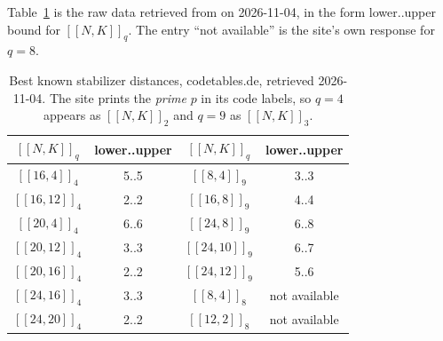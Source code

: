 Table~\ref{tab:grassl} is the raw data retrieved from
\cite{GrasslCodetables} on 2026-11-04, in the form lower..upper bound for
$[[N,K]]_q$. The entry ``not available'' is the site's own response for
$q=8$.

\begin{table}[ht]
\centering
\caption{Best known stabilizer distances, codetables.de, retrieved
2026-11-04. The site prints the \emph{prime} $p$ in its code labels, so
$q=4$ appears as $[[N,K]]_2$ and $q=9$ as $[[N,K]]_3$.}
\label{tab:grassl}
\begin{tabular}{@{}cc@{\qquad}cc@{}}\toprule
$[[N,K]]_q$ & lower..upper & $[[N,K]]_q$ & lower..upper\\\midrule
$[[16,4]]_4$   & 5..5  & $[[8,4]]_9$   & 3..3\\
$[[16,12]]_4$  & 2..2  & $[[16,8]]_9$  & 4..4\\
$[[20,4]]_4$   & 6..6  & $[[24,8]]_9$  & 6..8\\
$[[20,12]]_4$  & 3..3  & $[[24,10]]_9$ & 6..7\\
$[[20,16]]_4$  & 2..2  & $[[24,12]]_9$ & 5..6\\
$[[24,16]]_4$  & 3..3  & $[[8,4]]_8$   & not available\\
$[[24,20]]_4$  & 2..2  & $[[12,2]]_8$  & not available\\
\bottomrule
\end{tabular}
\end{table}
